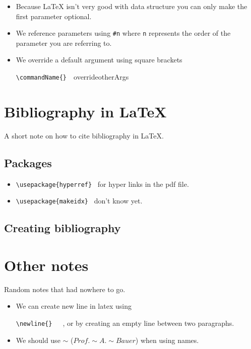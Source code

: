 \documentclass[a4paper]{article}
\newcommand{\command}[1]{
    \commandTwo{#1}{}\
}
\newcommand{\commandTwo}[2]{
    \texttt{\textbackslash{}#1\{#2\}}\
}
\newcommand{\package}[1]{
    \commandTwo{usepackage}{#1}
}
\begin{document}
\begin{itemize}
    \item Because \LaTeX{} isn't very good with data structure you can only make the first parameter optional.
    \item We reference parameters using \texttt{\#n} where \texttt{n} represents the order of the parameter you are referring to.
    \item We override a default argument using square brackets \newline
            \command{commandName}{override}{otherArgs}
  
\end{itemize}

\section{Bibliography in \LaTeX{}}

A short note on how to cite bibliography in \LaTeX{}.

\subsection{Packages}

\begin{itemize}
    \item \package{hyperref} for hyper links in the pdf file.
    \item \package{makeidx} don't know yet.
\end{itemize}

\subsection{Creating bibliography}

\section{Other notes}

Random notes that had nowhere to go.

\begin{itemize}
   \item We can create new line in latex using \command{newline}\ , or by creating an empty line between two paragraphs.
   \item We should use $\sim{}$ (\emph{$Prof. \sim{}A.\sim{}Bauer$}) when using names.
\end{itemize}
\end{document}
